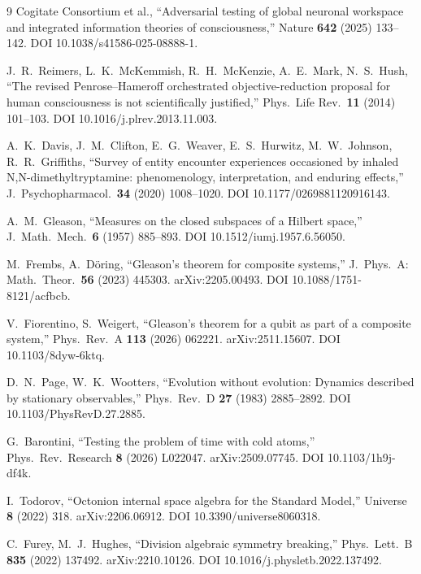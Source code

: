 \documentclass[12pt,a4paper,twoside]{article}
\theoremstyle{plain}
\theoremstyle{definition}
\theoremstyle{remark}
\begin{document}
\begin{thebibliography}{9}
Cogitate Consortium et al., ``Adversarial testing of global neuronal
workspace and integrated information theories of consciousness,''
Nature \textbf{642} (2025) 133--142.
DOI 10.1038/s41586-025-08888-1.

J.~R.~Reimers, L.~K.~McKemmish, R.~H.~McKenzie, A.~E.~Mark, N.~S.~Hush,
``The revised Penrose--Hameroff orchestrated objective-reduction proposal
for human consciousness is not scientifically justified,'' Phys.\ Life Rev.\
\textbf{11} (2014) 101--103. DOI 10.1016/j.plrev.2013.11.003.

A.~K.~Davis, J.~M.~Clifton, E.~G.~Weaver, E.~S.~Hurwitz,
M.~W.~Johnson, R.~R.~Griffiths, ``Survey of entity encounter experiences
occasioned by inhaled N,N-dimethyltryptamine: phenomenology,
interpretation, and enduring effects,'' J.\ Psychopharmacol.\
\textbf{34} (2020) 1008--1020. DOI 10.1177/0269881120916143.

A.~M.~Gleason, ``Measures on the closed subspaces of a Hilbert space,''
J.\ Math.\ Mech.\ \textbf{6} (1957) 885--893.
DOI 10.1512/iumj.1957.6.56050.

M.~Frembs, A.~D\"oring, ``Gleason's theorem for composite systems,''
J.\ Phys.\ A: Math.\ Theor.\ \textbf{56} (2023) 445303.
arXiv:2205.00493. DOI 10.1088/1751-8121/acfbcb.

V.~Fiorentino, S.~Weigert, ``Gleason's theorem for a qubit as part of a
composite system,'' Phys.\ Rev.\ A \textbf{113} (2026) 062221.
arXiv:2511.15607. DOI 10.1103/8dyw-6ktq.

D.~N.~Page, W.~K.~Wootters, ``Evolution without evolution: Dynamics
described by stationary observables,'' Phys.\ Rev.\ D \textbf{27} (1983)
2885--2892. DOI 10.1103/PhysRevD.27.2885.

G.~Barontini, ``Testing the problem of time with cold atoms,''
Phys.\ Rev.\ Research \textbf{8} (2026) L022047.
arXiv:2509.07745. DOI 10.1103/1h9j-df4k.

I.~Todorov, ``Octonion internal space algebra for the Standard Model,''
Universe \textbf{8} (2022) 318. arXiv:2206.06912.
DOI 10.3390/universe8060318.

C.~Furey, M.~J.~Hughes, ``Division algebraic symmetry breaking,''
Phys.\ Lett.\ B \textbf{835} (2022) 137492.
arXiv:2210.10126. DOI 10.1016/j.physletb.2022.137492.

\end{thebibliography}
\end{document}
